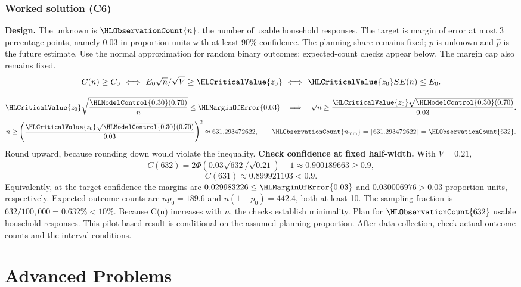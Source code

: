 \subsubsection*{Worked solution (C6)}\label{sol:t4-prop}
\textbf{Design.} The unknown is $\HLObservationCount{n}$, the number of usable household responses. The target is margin of error at most 3 percentage points, namely 0.03 in proportion units with at least 90\% confidence. The planning share remains fixed; $p$ is unknown and $\hat p$ is the future estimate. Use the normal approximation for random binary outcomes; expected-count checks appear below. The margin cap also remains fixed. 
\[C(n)\ge C_0\ \Longleftrightarrow\ E_0\sqrt n/\sqrt V\ge \HLCriticalValue{z_0}\ \Longleftrightarrow\ \HLCriticalValue{z_0}SE(n)\le E_0.\]

\[
\HLCriticalValue{z_0}\sqrt{\frac{\HLModelControl{0.30}(0.70)}{n}}\le \HLMarginOfError{0.03}\quad\Longrightarrow\quad\sqrt n\ge\frac{\HLCriticalValue{z_0}\sqrt{\HLModelControl{0.30}(0.70)}}{0.03}.
\]
\[n\ge\left(\frac{\HLCriticalValue{z_0}\sqrt{\HLModelControl{0.30}(0.70)}}{0.03}\right)^2\approx631.293472622,\qquad \HLObservationCount{n_{\min}}=\left\lceil 631.293472622\right\rceil=\HLObservationCount{632}.\]
Round upward, because rounding down would violate the inequality.
\textbf{Check confidence at fixed half-width.} With $V=0.21$,
\[
C(632)=2\Phi(0.03\sqrt{632}/\sqrt{0.21})-1\approx 0.900189663\ge 0.9,
\]
\[C(631)\approx 0.899921103<0.9.\]
Equivalently, at the target confidence the margins are $0.029983226\le \HLMarginOfError{0.03}$ and $0.030006976>0.03$ proportion units, respectively. Expected outcome counts are $np_0=189.6$ and $n(1-p_0)=442.4$, both at least 10. The sampling fraction is $632/100{,}000=0.632\%<10\%$. Because C(n) increases with $n$, the checks establish minimality. Plan for $\HLObservationCount{632}$ usable household responses. This pilot-based result is conditional on the assumed planning proportion. After data collection, check actual outcome counts and the interval conditions. 

\clearpage
\section{Advanced Problems}\label{sec:advanced}
\medskip
